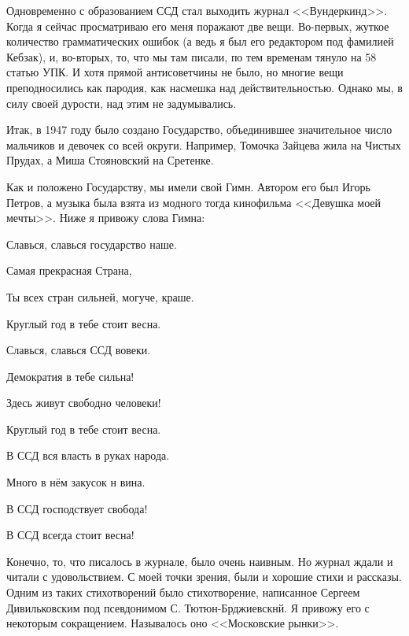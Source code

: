 Одновременно с образованием ССД стал выходить журнал <<Вундеркинд>>. Когда я сейчас просматриваю его меня поражают две вещи. Во-первых, жуткое количество грамматических ошибок (а ведь я был его редактором под фамилией Кебзак), и, во-вторых, то, что мы там писали, по тем временам тянуло на 58 статью УПК. И хотя прямой антисоветчины не было, но многие вещи преподносились как пародия, как насмешка над действительностью. Однако мы, в силу своей дурости, над этим не задумывались.

Итак, в 1947 году было создано Государство, объединившее значительное число мальчиков и девочек со всей округи. Например, Томочка Зайцева жила на Чистых Прудах, а Миша Стояновский на Сретенке.

Как и положено Государству, мы имели свой Гимн. Автором его был Игорь Петров, а музыка была взята из модного тогда кинофильма <<Девушка моей мечты>>. Ниже я привожу слова Гимна:

\indent

{\itshape

Славься, славься государство наше.

Самая прекрасная Страна,

Ты всех стран сильней, могуче, краше.

Круглый год в тебе стоит весна.

\indent

Славься, славься ССД вовеки.

Демократия в тебе сильна! 

Здесь живут свободно человеки! 

Круглый год в тебе стоит весна.

\indent

В ССД вся власть в руках народа.

Много в нём закусок н вина.

В ССД господствует свобода!

В ССД всегда стоит весна!
}

\indent

Конечно, то, что писалось в журнале, было очень наивным. Но журнал ждали и читали с удовольствием. С моей точки зрения, были и хорошие стихи и рассказы. Одним из таких стихотворений было стихотворение, написанное Сергеем Дивильковским под псевдонимом С. Тютюн-Брджиевскнй. Я привожу его с некоторым сокращением. Называлось оно <<Московские рынки>>.

\indent

